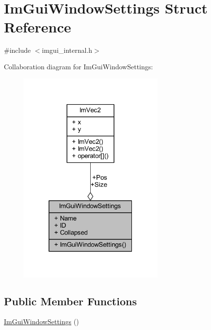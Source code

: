 \hypertarget{struct_im_gui_window_settings}{}\section{Im\+Gui\+Window\+Settings Struct Reference}
\label{struct_im_gui_window_settings}


{\ttfamily \#include $<$imgui\+\_\+internal.\+h$>$}



Collaboration diagram for Im\+Gui\+Window\+Settings\+:
\nopagebreak
\begin{figure}[H]
\begin{center}
\leavevmode
\includegraphics[width=208pt]{struct_im_gui_window_settings__coll__graph}
\end{center}
\end{figure}
\subsection*{Public Member Functions}
\begin{DoxyCompactItemize}
\item 
\mbox{\hyperlink{struct_im_gui_window_settings_a694e496dba59b5aaabe14cce66309acd}{Im\+Gui\+Window\+Settings}} ()
\end{DoxyCompactItemize}
